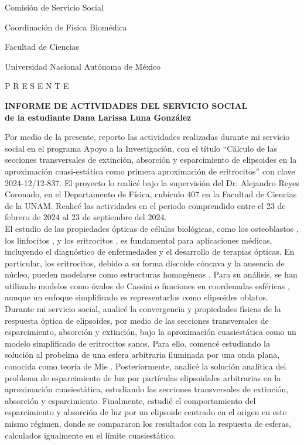 \documentclass[9pt,letterpaper]{article}
\begin{document}
	Comisión de Servicio Social
	
	Coordinación de Física Biomédica
	
	Facultad de Ciencias
	
	Universidad Nacional Autónoma de México
	
	P R E S E N T E
	
	\vspace{1cm}
	
	\begin{center}
		\textbf{INFORME DE ACTIVIDADES DEL SERVICIO SOCIAL}\\
		\textbf{de la estudiante Dana Larissa Luna González}
	\end{center}
	
Por medio de la presente, reporto las actividades realizadas durante mi servicio social en el programa Apoyo a la Investigación, con el título ``Cálculo de las secciones transversales de extinción, absorción y esparcimiento de elipsoides en la aproximación cuasi-estática como primera aproximación de eritrocitos'' con clave 2024-12/12-837. El proyecto lo realicé bajo la supervisión del Dr. Alejandro Reyes Coronado, en el Departamento de Física, cubículo 407 en la Facultad de Ciencias de la UNAM. Realicé las actividades en el periodo comprendido entre el 23 de febrero de 2024 al 23 de septiembre del 2024. \\

El estudio de las propiedades ópticas de células biológicas, como los osteoblastos \cite{Osteoblastos}, los linfocitos \cite{Linfocitos}, y los eritrocitos \cite{Blood}, es fundamental para aplicaciones médicas, incluyendo el diagnóstico de enfermedades y el desarrollo de terapias ópticas. En particular, los eritrocitos, debido a su forma discoide cóncava y la ausencia de núcleo, pueden modelarse como estructuras homogéneas \cite{Cassini}. Para su análisis, se han utilizado modelos como óvalos de Cassini \cite{Cassini} o funciones en coordenadas esféricas \cite{Esferico}, aunque un enfoque simplificado es representarlos como elipsoides oblatos.\\

 Durante mi servicio social, analicé la convergencia y propiedades físicas de la respuesta óptica de elipsoides, por medio de las secciones transversales de esparcimiento, absorción y extinción, bajo la aproximación cuasiestática como un modelo simplificado de eritrocitos sanos. Para ello, comencé estudiando la solución al probelma de una esfera arbitraria iluminada por una onda plana, conocida como teoría de Mie \cite{Bohren}. Posteriormente, analicé la solución analítica del problema de esparcimiento de luz por partículas elipsoidales arbitrarias en la aproximación cuasiestática, estudiando las secciones transversales de extinción, absorción y esparcimiento. Finalmente, estudié el comportamiento del esparcimiento y absorción de luz por un elipsoide centrado en el origen en este mismo régimen, donde se compararon los resultados con la respuesta de esferas, calculados igualmente en el límite cuasiestático.\\
 
\end{document}
